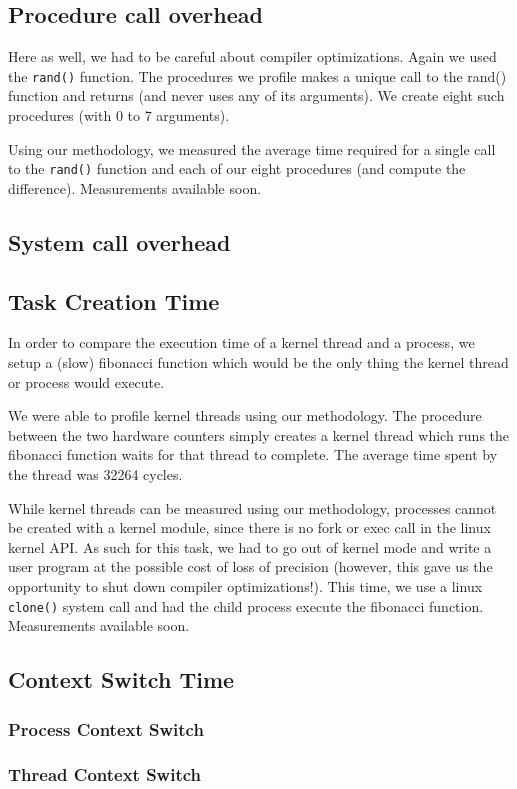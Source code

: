 \subsection{Procedure call overhead}

Here as well, we had to be careful about compiler optimizations. Again we used
the \texttt{rand()} function. The procedures we profile makes a unique call to
the rand() function and returns (and never uses any of its arguments). We create
eight such procedures (with 0 to 7 arguments).

Using our methodology, we measured the average time required for a single call
to the \texttt{rand()} function and each of our eight procedures (and compute
the difference). Measurements available soon.

\subsection{System call overhead}

\subsection{Task Creation Time}

In order to compare the execution time of a kernel thread and a process, we
setup a (slow) fibonacci function which would be the only thing the kernel
thread or process would execute.

We were able to profile kernel threads using our methodology. The procedure
between the two hardware counters simply creates a kernel thread which runs the
fibonacci function waits for that thread to complete. The average time spent by
the thread was 32264 cycles.

While kernel threads can be measured using our methodology, processes cannot be
created with a kernel module, since there is no fork or exec call in the linux
kernel API. As such for this task, we had to go out of kernel mode and write a
user program at the possible cost of loss of precision (however, this gave us
the opportunity to shut down compiler optimizations!). This time, we use a linux
\texttt{clone()} system call and had the child process execute the fibonacci
function. Measurements available soon.

\subsection{Context Switch Time} \subsubsection{Process Context Switch}
\subsubsection{Thread Context Switch}
